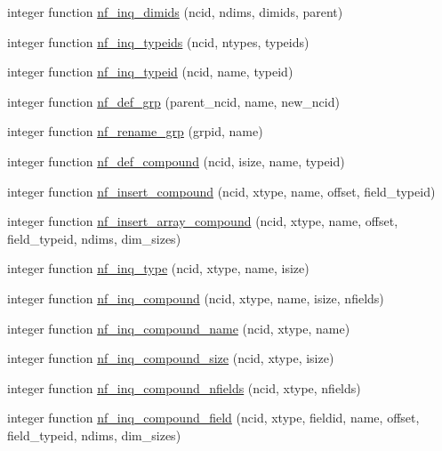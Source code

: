 \begin{DoxyCompactItemize}
\item 
integer function \hyperlink{nf__nc4_8f90_ad3c1bd2f25f137de75f492091d41eedf}{nf\+\_\+inq\+\_\+dimids} (ncid, ndims, dimids, parent)
\item 
integer function \hyperlink{nf__nc4_8f90_adcbd30e7ca8d10327a7bb52f7184972d}{nf\+\_\+inq\+\_\+typeids} (ncid, ntypes, typeids)
\item 
integer function \hyperlink{nf__nc4_8f90_a14dcc8db40c6cad2186f1a281e222b27}{nf\+\_\+inq\+\_\+typeid} (ncid, name, typeid)
\item 
integer function \hyperlink{nf__nc4_8f90_ae54287df3c57aef973a360dbf495924c}{nf\+\_\+def\+\_\+grp} (parent\+\_\+ncid, name, new\+\_\+ncid)
\item 
integer function \hyperlink{nf__nc4_8f90_a64a1b89a08cbc89ad5360cfb2d17996c}{nf\+\_\+rename\+\_\+grp} (grpid, name)
\item 
integer function \hyperlink{nf__nc4_8f90_a5de0e7952f0f6b47facccd913f55a2aa}{nf\+\_\+def\+\_\+compound} (ncid, isize, name, typeid)
\item 
integer function \hyperlink{nf__nc4_8f90_a5a7f5d9b4ea5fed320a28c2cf6eb98a6}{nf\+\_\+insert\+\_\+compound} (ncid, xtype, name, offset, field\+\_\+typeid)
\item 
integer function \hyperlink{nf__nc4_8f90_a12a9918d1da01e7c69d3b2c5df98f302}{nf\+\_\+insert\+\_\+array\+\_\+compound} (ncid, xtype, name, offset, field\+\_\+typeid, ndims, dim\+\_\+sizes)
\item 
integer function \hyperlink{nf__nc4_8f90_ab1fb0c900f72bfec3ef6b0d285f7347c}{nf\+\_\+inq\+\_\+type} (ncid, xtype, name, isize)
\item 
integer function \hyperlink{nf__nc4_8f90_a62e92d7657430f2e1346be19e503e318}{nf\+\_\+inq\+\_\+compound} (ncid, xtype, name, isize, nfields)
\item 
integer function \hyperlink{nf__nc4_8f90_a65875c90d95fc58afba91e1e9ab2387a}{nf\+\_\+inq\+\_\+compound\+\_\+name} (ncid, xtype, name)
\item 
integer function \hyperlink{nf__nc4_8f90_a4ef47b1d6bdc7c0ed2bc8129c89b3158}{nf\+\_\+inq\+\_\+compound\+\_\+size} (ncid, xtype, isize)
\item 
integer function \hyperlink{nf__nc4_8f90_ac8a9472c6942ef71d2dfde75617b5e64}{nf\+\_\+inq\+\_\+compound\+\_\+nfields} (ncid, xtype, nfields)
\item 
integer function \hyperlink{nf__nc4_8f90_a43383646bdaf42eb59b94b00f90aaafd}{nf\+\_\+inq\+\_\+compound\+\_\+field} (ncid, xtype, fieldid, name, offset, field\+\_\+typeid, ndims, dim\+\_\+sizes)

\end{DoxyCompactItemize}
